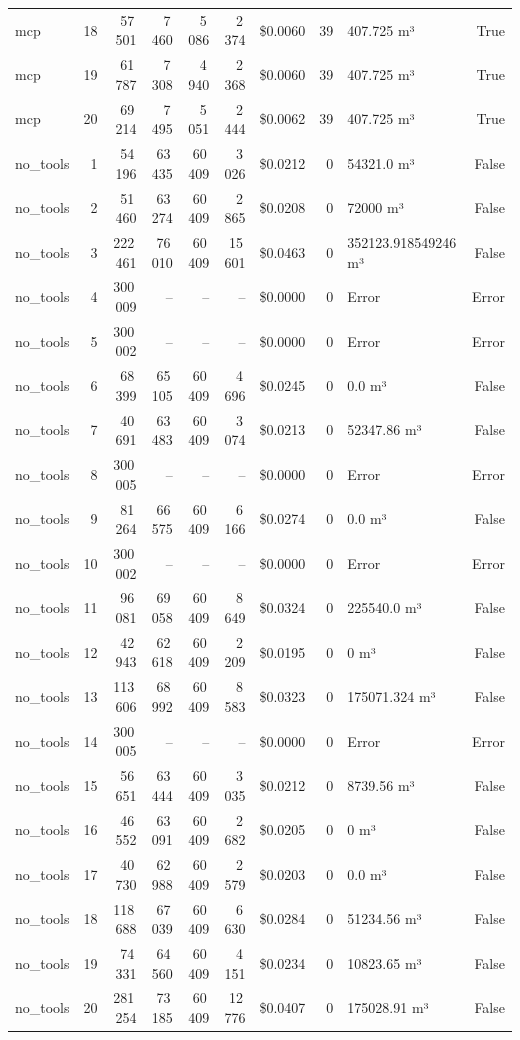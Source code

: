 \documentclass[a4paper,11pt]{article}
\begin{document}
\begin{table}[H]
{\begin{tabular}{l r r r r r r r l r}
mcp & 18 & 57\,501 & 7\,460 & 5\,086 & 2\,374 & \$0.0060 & 39 & 407.725 m³ & True \\
mcp & 19 & 61\,787 & 7\,308 & 4\,940 & 2\,368 & \$0.0060 & 39 & 407.725 m³ & True \\
mcp & 20 & 69\,214 & 7\,495 & 5\,051 & 2\,444 & \$0.0062 & 39 & 407.725 m³ & True \\
\midrule
no\_tools & 1 & 54\,196 & 63\,435 & 60\,409 & 3\,026 & \$0.0212 & 0 & 54321.0 m³ & False \\
no\_tools & 2 & 51\,460 & 63\,274 & 60\,409 & 2\,865 & \$0.0208 & 0 & 72000 m³ & False \\
no\_tools & 3 & 222\,461 & 76\,010 & 60\,409 & 15\,601 & \$0.0463 & 0 & 352123.918549246 m³ & False \\
no\_tools & 4 & 300\,009 & -- & -- & -- & \$0.0000 & 0 & Error & Error \\
no\_tools & 5 & 300\,002 & -- & -- & -- & \$0.0000 & 0 & Error & Error \\
no\_tools & 6 & 68\,399 & 65\,105 & 60\,409 & 4\,696 & \$0.0245 & 0 & 0.0 m³ & False \\
no\_tools & 7 & 40\,691 & 63\,483 & 60\,409 & 3\,074 & \$0.0213 & 0 & 52347.86 m³ & False \\
no\_tools & 8 & 300\,005 & -- & -- & -- & \$0.0000 & 0 & Error & Error \\
no\_tools & 9 & 81\,264 & 66\,575 & 60\,409 & 6\,166 & \$0.0274 & 0 & 0.0 m³ & False \\
no\_tools & 10 & 300\,002 & -- & -- & -- & \$0.0000 & 0 & Error & Error \\
no\_tools & 11 & 96\,081 & 69\,058 & 60\,409 & 8\,649 & \$0.0324 & 0 & 225540.0 m³ & False \\
no\_tools & 12 & 42\,943 & 62\,618 & 60\,409 & 2\,209 & \$0.0195 & 0 & 0 m³ & False \\
no\_tools & 13 & 113\,606 & 68\,992 & 60\,409 & 8\,583 & \$0.0323 & 0 & 175071.324 m³ & False \\
no\_tools & 14 & 300\,005 & -- & -- & -- & \$0.0000 & 0 & Error & Error \\
no\_tools & 15 & 56\,651 & 63\,444 & 60\,409 & 3\,035 & \$0.0212 & 0 & 8739.56 m³ & False \\
no\_tools & 16 & 46\,552 & 63\,091 & 60\,409 & 2\,682 & \$0.0205 & 0 & 0 m³ & False \\
no\_tools & 17 & 40\,730 & 62\,988 & 60\,409 & 2\,579 & \$0.0203 & 0 & 0.0 m³ & False \\
no\_tools & 18 & 118\,688 & 67\,039 & 60\,409 & 6\,630 & \$0.0284 & 0 & 51234.56 m³ & False \\
no\_tools & 19 & 74\,331 & 64\,560 & 60\,409 & 4\,151 & \$0.0234 & 0 & 10823.65 m³ & False \\
no\_tools & 20 & 281\,254 & 73\,185 & 60\,409 & 12\,776 & \$0.0407 & 0 & 175028.91 m³ & False \\
\bottomrule
\end{tabular}}
\end{table}
\end{document}
